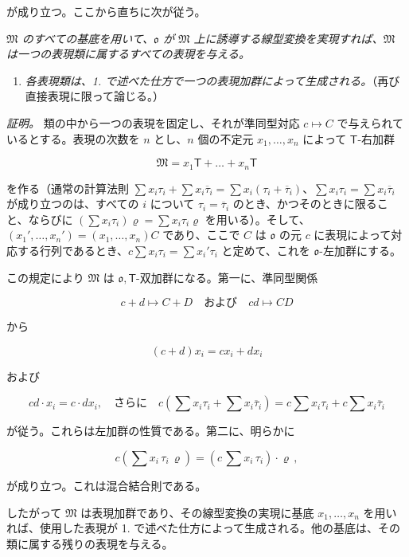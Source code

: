 が成り立つ。ここから直ちに次が従う。

\emph{$\mathfrak M$ のすべての基底を用いて、$\mathfrak{o}$ が $\mathfrak M$ 上に誘導する線型変換を実現すれば、$\mathfrak M$ は一つの表現類に属するすべての表現を与える。}

\begin{enumerate}
\def\labelenumi{\arabic{enumi}.}
\setcounter{enumi}{1}
\tightlist
\item
  \emph{各表現類は、1. で述べた仕方で一つの表現加群によって生成される。}（再び直接表現に限って論じる。）
\end{enumerate}

\emph{証明。} 類の中から一つの表現を固定し、それが準同型対応 $c\mapsto C$ で与えられているとする。表現の次数を $n$ とし、$n$ 個の不定元 $x_1,\ldots,x_n$ によって $\mathsf T$-右加群

\[\mathfrak{M} = x_1 \mathsf{T} + \dots + x_n \mathsf{T}\]

を作る（通常の計算法則 $\sum x_i\tau_i+\sum x_i\overline{\tau}_i=\sum x_i(\tau_i+\overline{\tau}_i)$、$\sum x_i\tau_i=\sum x_i\overline{\tau}_i$ が成り立つのは、すべての $i$ について $\tau_i=\overline{\tau}_i$ のとき、かつそのときに限ること、ならびに $(\sum x_i\tau_i)\varrho=\sum x_i\tau_i\varrho$ を用いる）。そして、$(x_1',\ldots,x_n')=(x_1,\ldots,x_n)C$ であり、ここで $C$ は $\mathfrak{o}$ の元 $c$ に表現によって対応する行列であるとき、$c\sum x_i\tau_i=\sum x_i'\tau_i$ と定めて、これを $\mathfrak{o}$-左加群にする。

この規定により $\mathfrak M$ は $\mathfrak{o},\mathsf T$-双加群になる。第一に、準同型関係

\[
c+d\mapsto C+D \quad \text{および} \quad cd\mapsto CD
\]

から

\[
(c+d)x_i=cx_i+dx_i
\]

および

\[
cd\cdot x_i=c\cdot dx_i,\quad\text{さらに}\quad
c\left(\sum x_i\tau_i+\sum x_i\overline{\tau}_i\right)
=c\sum x_i\tau_i+c\sum x_i\overline{\tau}_i
\]

が従う。これらは左加群の性質である。第二に、明らかに

\[c(\sum x_i \, \tau_i \, \varrho) = (c \, \sum x_i \, \tau_i) \cdot \varrho \,,\]

が成り立つ。これは混合結合則である。

したがって $\mathfrak M$ は表現加群であり、その線型変換の実現に基底 $x_1,\ldots,x_n$ を用いれば、使用した表現が 1. で述べた仕方によって生成される。他の基底は、その類に属する残りの表現を与える。

